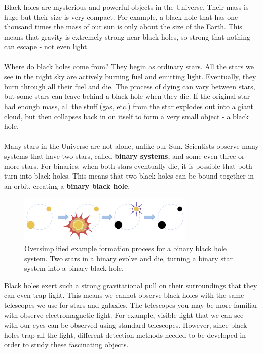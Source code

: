 \documentclass[14pt]{article}
\begin{document}
Black holes are mysterious and powerful objects in the Universe. Their mass is huge but their size is very compact. For example, a black hole that has one thousand times the mass of our sun is only about the size of the Earth. This means that gravity is extremely strong near black holes, so strong that nothing can escape - not even light.
\\\\
Where do black holes come from? They begin as ordinary stars. All the stars we see in the night sky are actively burning fuel and emitting light. Eventually, they burn through all their fuel and die. The process of dying can vary between stars, but some stars can leave behind a black hole when they die. If the original star had enough mass, all the stuff (gas, etc.) from the star explodes out into a giant cloud, but then collapses back in on itself to form a very small object - a black hole.
\\\\
Many stars in the Universe are not alone, unlike our Sun. Scientists observe many systems that have two stars, called \textbf{binary systems}, and some even three or more stars. For binaries, when both stars eventually die, it is possible that both turn into black holes. This means that two black holes can be bound together in an orbit, creating a \textbf{binary black hole}.

\begin{figure}[h]
    \centering
    \includegraphics[width=0.75\textwidth]{bbh_formation.png}
    \caption{Oversimplified example formation process for a binary black hole system. Two stars in a binary evolve and die, turning a binary star system into a binary black hole.}
    \label{fig:bbh_form}
\end{figure}

\noindent Black holes exert such a strong gravitational pull on their surroundings that they can even trap light. This means we cannot observe black holes with the same telescopes we use for stars and galaxies. The telescopes you may be more familiar with observe electromagnetic light. For example, visible light that we can see with our eyes can be observed using standard telescopes. However, since black holes trap all the light, different detection methods needed to be developed in order to study these fascinating objects. \\
\end{document}
